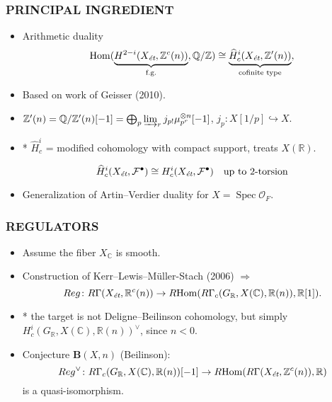 \documentclass[handout]{beamer}
\newcommand{\CC}{\mathbb{C}}
\newcommand{\QQ}{\mathbb{Q}}
\newcommand{\RR}{\mathbb{R}}
\newcommand{\ZZ}{\mathbb{Z}}
\DeclareMathOperator{\Hom}{Hom}
\DeclareMathOperator{\Spec}{Spec}
\newcommand{\et}{\text{\it ét}}
\newcommand{\RHom}{R\!\Hom}
\begin{document}

\begin{frame}
  \frametitle{PRINCIPAL INGREDIENT}

  \begin{itemize}
  \item<2-> Arithmetic duality
    \[ \Hom (\underbrace{H^{2-i} (X_\et, \ZZ^c (n))}_{\text{f.g.}}, \QQ/\ZZ) \cong
      \underbrace{\widehat{H}^i_c (X_\et, \ZZ' (n))}_{\text{cofinite type}}, \]

  \item<3-> Based on work of Geisser (2010).

  \item<4-> $\ZZ' (n) = \QQ/\ZZ' (n) [-1] = \bigoplus_p \varinjlim_r j_{p!} \mu_{p^r}^{\otimes n} [-1]$,
    \quad $j_p\colon X[1/p] \hookrightarrow X$.

  \item<5-> * $\widehat{H}^i_c$ = modified cohomology with compact support,
    treats $X (\RR)$.

    \[ \widehat{H}^i_c (X_\et, \mathcal{F}^\bullet) \cong
      H^i_c (X_\et, \mathcal{F}^\bullet) \quad
      \text{up to }2\text{-torsion} \]

  \item<6-> Generalization of Artin--Verdier duality for
    $X = \Spec \mathcal{O}_F$.
  \end{itemize}
\end{frame}


\begin{frame}
  \frametitle{REGULATORS}

  \begin{itemize}
  \item<2-> Assume the fiber $X_\CC$ is smooth.

  \item<3-> Construction of Kerr--Lewis--Müller-Stach (2006) $\Longrightarrow$
    \[ Reg\colon R\Gamma (X_\et, \RR^c (n)) \to
      \RHom (R\Gamma_c (G_\RR, X(\CC), \RR (n)), \RR[1]). \]

  \item<4-> * the target is not Deligne--Beilinson cohomology, but simply
    $H_c^i (G_\RR, X(\CC), \RR (n))^\vee$, since $n < 0$.

  \item<5-> Conjecture $\mathbf{B} (X,n)$ (Beilinson):
    \[ Reg^\vee\colon R\Gamma_c (G_\RR, X (\CC), \RR (n)) [-1] \to
      \RHom (R\Gamma (X_\et, \ZZ^c (n)), \RR) \]
    is a quasi-isomorphism.
  \end{itemize}
\end{frame}
\end{document}
